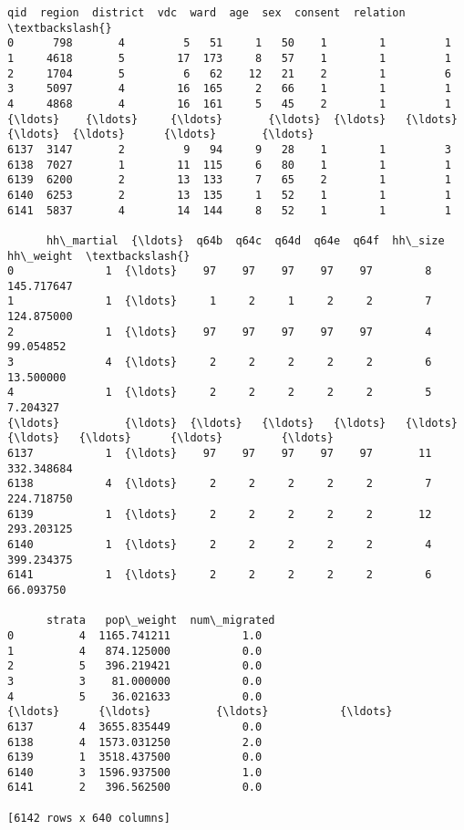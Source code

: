 \documentclass[11pt]{article}
\makeatletter
\newcommand{\boxspacing}{\kern\kvtcb@left@rule\kern\kvtcb@boxsep}
\newcommand{\prompt}[4]{
        {\ttfamily\llap{{\color{#2}[#3]:\hspace{3pt}#4}}\vspace{-\baselineskip}}
    }
\makeatother
\begin{document}
            \begin{tcolorbox}[breakable, size=fbox, boxrule=.5pt, pad at break*=1mm, opacityfill=0]
\prompt{Out}{outcolor}{5}{\boxspacing}
\begin{Verbatim}[commandchars=\\\{\}]
       qid  region  district  vdc  ward  age  sex  consent  relation  \textbackslash{}
0      798       4         5   51     1   50    1        1         1
1     4618       5        17  173     8   57    1        1         1
2     1704       5         6   62    12   21    2        1         6
3     5097       4        16  165     2   66    1        1         1
4     4868       4        16  161     5   45    2        1         1
{\ldots}    {\ldots}     {\ldots}       {\ldots}  {\ldots}   {\ldots}  {\ldots}  {\ldots}      {\ldots}       {\ldots}
6137  3147       2         9   94     9   28    1        1         3
6138  7027       1        11  115     6   80    1        1         1
6139  6200       2        13  133     7   65    2        1         1
6140  6253       2        13  135     1   52    1        1         1
6141  5837       4        14  144     8   52    1        1         1

      hh\_martial  {\ldots}  q64b  q64c  q64d  q64e  q64f  hh\_size   hh\_weight  \textbackslash{}
0              1  {\ldots}    97    97    97    97    97        8  145.717647
1              1  {\ldots}     1     2     1     2     2        7  124.875000
2              1  {\ldots}    97    97    97    97    97        4   99.054852
3              4  {\ldots}     2     2     2     2     2        6   13.500000
4              1  {\ldots}     2     2     2     2     2        5    7.204327
{\ldots}          {\ldots}  {\ldots}   {\ldots}   {\ldots}   {\ldots}   {\ldots}   {\ldots}      {\ldots}         {\ldots}
6137           1  {\ldots}    97    97    97    97    97       11  332.348684
6138           4  {\ldots}     2     2     2     2     2        7  224.718750
6139           1  {\ldots}     2     2     2     2     2       12  293.203125
6140           1  {\ldots}     2     2     2     2     2        4  399.234375
6141           1  {\ldots}     2     2     2     2     2        6   66.093750

      strata   pop\_weight  num\_migrated
0          4  1165.741211           1.0
1          4   874.125000           0.0
2          5   396.219421           0.0
3          3    81.000000           0.0
4          5    36.021633           0.0
{\ldots}      {\ldots}          {\ldots}           {\ldots}
6137       4  3655.835449           0.0
6138       4  1573.031250           2.0
6139       1  3518.437500           0.0
6140       3  1596.937500           1.0
6141       2   396.562500           0.0

[6142 rows x 640 columns]
\end{Verbatim}
\end{tcolorbox}
        
\end{document}
